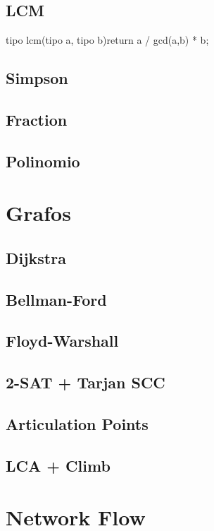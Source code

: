 \subsection{LCM}
\begin{code}
tipo lcm(tipo a, tipo b){return a / gcd(a,b) * b;}
\end{code}
\subsection{Simpson}
\subsection{Fraction}
\subsection{Polinomio}
\section{Grafos}%
\subsection{Dijkstra}
\subsection{Bellman-Ford}
\subsection{Floyd-Warshall}
\subsection{2-SAT + Tarjan SCC}
\subsection{Articulation Points}
\subsection{LCA + Climb}
\section{Network Flow}
